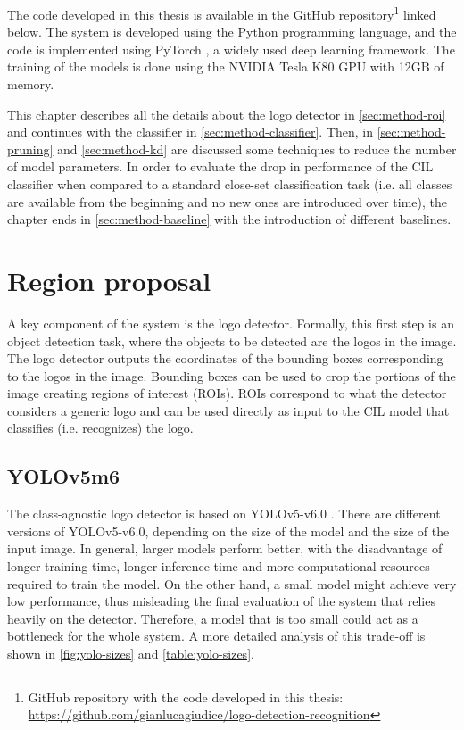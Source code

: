 The code developed in this thesis is available in the GitHub repository\footnote{GitHub repository with the code developed in this thesis: \\ \href{https://github.com/gianlucagiudice/logo-detection-recognition}{https://github.com/gianlucagiudice/logo-detection-recognition}} linked below. The system is developed using the Python programming language, and the code is implemented using PyTorch \cite{paszke2019pytorch}, a widely used deep learning framework. The training of the models is done using the NVIDIA Tesla K80 GPU with 12GB of memory.

\vspace{1.5\baselineskip}
This chapter describes all the details about the logo detector in \autoref{sec:method-roi} and continues with the classifier in \autoref{sec:method-classifier}. Then, in \autoref{sec:method-pruning} and \autoref{sec:method-kd} are discussed some techniques to reduce the number of model parameters. In order to evaluate the drop in performance of the CIL classifier when compared to a standard close-set classification task (i.e. all classes are available from the beginning and no new ones are introduced over time),
the chapter ends in \autoref{sec:method-baseline} with the introduction of different baselines.

\section{Region proposal}
A key component of the system is the logo detector. Formally, this first step is an object detection task, where the objects to be detected are the logos in the image. The logo detector outputs the coordinates of the bounding boxes corresponding to the logos in the image.
Bounding boxes can be used to crop the portions of the image creating regions of interest (ROIs).
ROIs correspond to what the detector considers a generic logo and can be used directly as input to the CIL model that classifies (i.e. recognizes) the logo.

\label{sec:method-roi}
\subsection{YOLOv5m6}
The class-agnostic logo detector is based on YOLOv5-v6.0 \cite{glenn_jocher_2021_5563715}.
There are different versions of YOLOv5-v6.0, depending on the size of the model and the size of the input image.
In general, larger models perform better, with the disadvantage of longer training time, longer inference time and more computational resources required to train the model.
On the other hand, a small model might achieve very low performance, thus misleading the final evaluation of the system that relies heavily on the detector.
Therefore, a model that is too small could act as a bottleneck for the whole system. A more detailed analysis of this trade-off is shown in \autoref{fig:yolo-sizes} and \autoref{table:yolo-sizes}.


